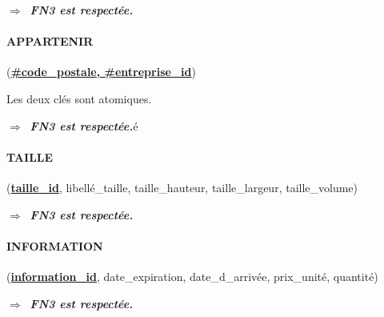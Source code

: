 $\Longrightarrow\:$ \textbf{\textit{FN3 est respectée.}}

\paragraph{APPARTENIR} (\textbf{\underline{\#code\_postale, \#entreprise\_id}})

Les deux clés sont atomiques.

$\Longrightarrow\:$ \textbf{\textit{FN3 est respectée.}}é

\paragraph{TAILLE} (\textbf{\underline{taille\_id}}, libellé\_taille, taille\_hauteur, taille\_largeur, taille\_volume)

$\Longrightarrow\:$ \textbf{\textit{FN3 est respectée.}}

\paragraph{INFORMATION} (\textbf{\underline{information\_id}}, date\_expiration, date\_d\_arrivée, prix\_unité, quantité)

$\Longrightarrow\:$ \textbf{\textit{FN3 est respectée.}}
